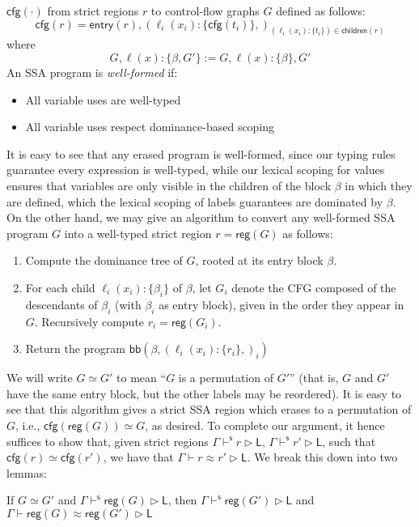 \documentclass[acmsmall,screen,review]{acmart}
\newcommand{\ms}[1]{\ensuremath{\mathsf{#1}}}
\newcommand{\lto}{:}
\newcommand{\wbranch}[3]{#1(#2) \lto \{#3\}}
\newcommand{\shaslb}[3]{#1 \vdash^{\ms{s}} #2 \rhd #3}
\newcommand{\teqv}{\approx}
\newcommand{\lbeq}[4]{#1 \vdash #2 \teqv #3 \rhd {#4}}
\newcommand{\toentry}[1]{\ms{entry}(#1)}
\newcommand{\todom}[1]{\ms{children}(#1)}
\newcommand{\tocfg}[1]{\ms{cfg}(#1)}
\newcommand{\adddom}[2]{\ms{bb}(#1, #2)}
\newcommand{\toreg}[1]{\ms{reg}(#1)}
\begin{document}
$\tocfg{\cdot}$ from strict regions $r$ to control-flow graphs $G$ defined as follows:
\begin{equation}
    \tocfg{r} = \toentry{r}, (\wbranch{\ell_i}{x_i}{\tocfg{t_i}},)_{
      (\wbranch{\ell_i}{x_i}{t_i}) \in \todom{r}}
\end{equation}
where
\begin{equation}
  G, \wbranch{\ell}{x}{\beta, G'} := G, \wbranch{\ell}{x}{\beta}, G' 
\end{equation}
An SSA program is \emph{well-formed} if:
\begin{itemize}
  \item All variable uses are well-typed
  \item All variable uses respect dominance-based scoping
\end{itemize}
It is easy to see that any erased program is well-formed, since our typing rules guarantee every
expression is well-typed, while our lexical scoping for values ensures that variables are only
visible in the children of the block $\beta$ in which they are defined, which the lexical scoping of
labels guarantees are dominated by $\beta$. On the other hand, we may give an algorithm to convert
any well-formed SSA program $G$ into a well-typed strict region $r = \toreg{G}$ as follows:
\begin{enumerate}
  \item Compute the dominance tree of $G$, rooted at its entry block $\beta$.
  \item For each child $\wbranch{\ell_i}{x_i}{\beta_i}$ of $\beta$, let $G_i$ denote the CFG
  composed of the descendants of $\beta_i$ (with $\beta_i$ as entry block), given in the order they
  appear in $G$. Recursively compute $r_i = \toreg{G_i}$.
  \item Return the program $\adddom{\beta}{(\wbranch{\ell_i}{x_i}{r_i},)_i}$
\end{enumerate}
We will write $G \simeq G'$ to mean ``$G$ is a permutation of $G'$'' (that is, $G$ and $G'$
have the same entry block, but the other labels may be reordered). It is easy to see that this algorithm
gives a strict SSA region
which erases to a permutation of $G$, i.e., $\tocfg{\toreg{G}} \simeq G$, as desired. To complete
our argument, it hence suffices to show that, given strict regions $\shaslb{\Gamma}{r}{\ms{L}}$,
$\shaslb{\Gamma}{r'}{\ms{L}}$, such that $\tocfg{r} \simeq \tocfg{r'}$, we have that
$\lbeq{\Gamma}{r}{r'}{\ms{L}}$. We break this down into two lemmas:
\begin{lemma}[name=Permutation Invariance, restate=cfgperminvar]
  If $G \simeq G'$ and $\shaslb{\Gamma}{\toreg{G}}{\ms{L}}$, then 
    $\shaslb{\Gamma}{\toreg{G'}}{\ms{L}}$ and $\lbeq{\Gamma}{\toreg{G}}{\toreg{G'}}{\ms{L}}$
\end{lemma}
\end{document}

